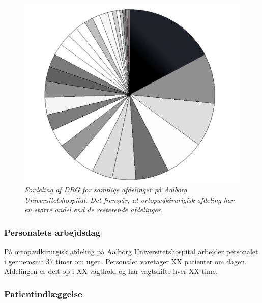 \begin{figure}[H]
	\flushleft 
	\centering
	\includegraphics[scale=0.35]{figures/Ortopaeddiagram.png}
	\flushleft
	\caption{\textit{Fordeling af DRG for samtlige afdelinger på Aalborg Universitetshospital. Det fremgår, at ortopædkirurigisk afdeling har en større andel end de resterende afdelinger.}\cite{Rasmussen2016}}
	\label{DRG_budget}
\end{figure}


\subsubsection{Personalets arbejdsdag} 
På ortopædkirurgisk afdeling på Aalborg Universitetshospital arbejder personalet i gennemsnit 37 timer om ugen\cite{Danske2015}. Personalet varetager XX patienter om dagen. Afdelingen er delt op i XX vagthold og har vagtskifte hver XX time. 

\subsubsection{Patientindlæggelse}



